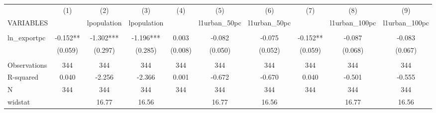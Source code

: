\documentclass[]{article}
\begin{document}
\begin{tabular}{lccccccccc} \hline
 & (1) & (2) & (3) & (4) & (5) & (6) & (7) & (8) & (9) \\
VARIABLES &  & lpopulation & lpopulation &  & l1urban\_50pc & l1urban\_50pc &  & l1urban\_100pc & l1urban\_100pc \\ \hline
 &  &  &  &  &  &  &  &  &  \\
ln\_exportpc & -0.152** & -1.302*** & -1.196*** & 0.003 & -0.082 & -0.075 & -0.152** & -0.087 & -0.083 \\
 & (0.059) & (0.297) & (0.285) & (0.008) & (0.050) & (0.052) & (0.059) & (0.068) & (0.067) \\
 &  &  &  &  &  &  &  &  &  \\
Observations & 344 & 344 & 344 & 344 & 344 & 344 & 344 & 344 & 344 \\
R-squared & 0.040 & -2.256 & -2.366 & 0.001 & -0.672 & -0.670 & 0.040 & -0.501 & -0.555 \\
N & 344 & 344 & 344 & 344 & 344 & 344 & 344 & 344 & 344 \\
 widstat &  & 16.77 & 16.56 &  & 16.77 & 16.56 &  & 16.77 & 16.56 \\ \hline
\end{tabular}
\end{document}

